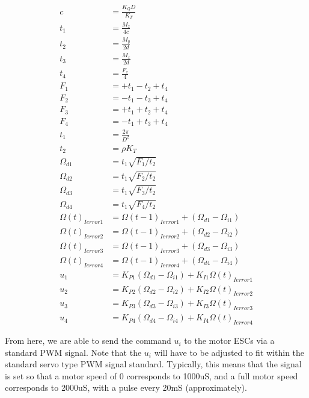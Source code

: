 \documentclass{article}
\numberwithin{equation}{section} %
\begin{document}
\begin{align} 
c &= \frac{K_Q D}{K_T} \\
t_1 &= \frac{M_z}{4c} \\
t_2 &= \frac{M_y}{2d} \\
t_3 &= \frac{M_x}{2d} \\
t_4 &= \frac{F_z}{4} \\
F_1 &= +t_1 - t_2 + t_4 \\
F_2 &= -t_1 - t_3 + t_4 \\
F_3 &= +t_1 + t_2 + t_4 \\
F_4 &= -t_1 + t_3 + t_4 \\
t_1 &= \frac{2 \pi}{D^2} \\
t_2 &= \rho K_T \\
\Omega_{d1}	&=  t_1 \sqrt{F_1 / t_2} \\%
\Omega_{d2}	&=  t_1 \sqrt{F_2 / t_2} \\%
\Omega_{d3}	&=  t_1 \sqrt{F_3 / t_2} \\%
\Omega_{d4}	&=  t_1 \sqrt{F_4 / t_2} \\%
\Omega \left(t \right)_{ Ierror1} &= \Omega \left(t-1 \right)_{ Ierror1} + \left( \Omega_{d1} - \Omega_{i1} \right) \\
\Omega \left(t \right)_{ Ierror2} &= \Omega \left(t-1 \right)_{ Ierror2} + \left( \Omega_{d2} - \Omega_{i2} \right) \\
\Omega \left(t \right)_{ Ierror3} &= \Omega \left(t-1 \right)_{ Ierror3} + \left( \Omega_{d3} - \Omega_{i3} \right) \\
\Omega \left(t \right)_{ Ierror4} &= \Omega \left(t-1 \right)_{ Ierror4} + \left( \Omega_{d4} - \Omega_{i4} \right) \\
u_1 &= K_{P1} \left( \Omega_{d1} - \Omega_{i1} \right) + K_{I1} \Omega \left(t \right) _{Ierror1} \\
u_2 &= K_{P2} \left( \Omega_{d2} - \Omega_{i2} \right) + K_{I2} \Omega \left(t \right) _{Ierror2} \\
u_3 &= K_{P3} \left( \Omega_{d3} - \Omega_{i3} \right) + K_{I3} \Omega \left(t \right) _{Ierror3} \\
u_4 &= K_{P4} \left( \Omega_{d4} - \Omega_{i4} \right) + K_{I4} \Omega \left(t \right) _{Ierror4}
\end{align}

From here, we are able to send the command $u_i$ to the motor ESCs via a standard PWM signal. Note that the $u_i$ will have to be adjusted to fit within the standard servo type PWM signal standard. Typically, this means that the signal is set so that a motor speed of 0 corresponds to 1000uS, and a full motor speed corresponds to 2000uS, with a pulse every 20mS (approximately).
\end{document}
